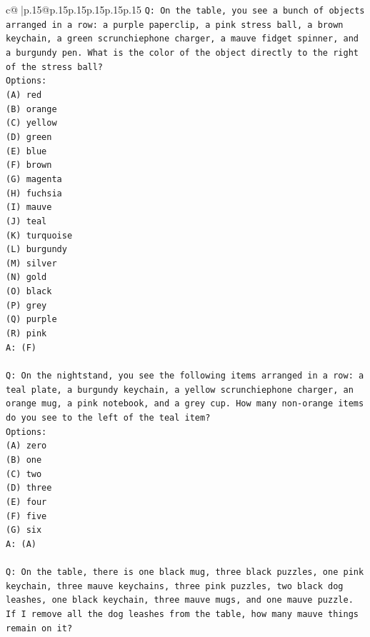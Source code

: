 \documentclass{article}
\begin{document}
{\begin{supertabular}{c@{$\;$}|p{.15\linewidth}@{}p{.15\linewidth}p{.15\linewidth}p{.15\linewidth}p{.15\linewidth}p{.15\linewidth}}
{{{\texttt{Q: On the table, you see a bunch of objects arranged in a row: a purple paperclip, a pink stress ball, a brown keychain, a green scrunchiephone charger, a mauve fidget spinner, and a burgundy pen. What is the color of the object directly to the right of the stress ball?} \\
\texttt{Options:} \\
\texttt{(A) red} \\
\texttt{(B) orange} \\
\texttt{(C) yellow} \\
\texttt{(D) green} \\
\texttt{(E) blue} \\
\texttt{(F) brown} \\
\texttt{(G) magenta} \\
\texttt{(H) fuchsia} \\
\texttt{(I) mauve} \\
\texttt{(J) teal} \\
\texttt{(K) turquoise} \\
\texttt{(L) burgundy} \\
\texttt{(M) silver} \\
\texttt{(N) gold} \\
\texttt{(O) black} \\
\texttt{(P) grey} \\
\texttt{(Q) purple} \\
\texttt{(R) pink} \\
\texttt{A: (F)} \\
\\ 
\texttt{Q: On the nightstand, you see the following items arranged in a row: a teal plate, a burgundy keychain, a yellow scrunchiephone charger, an orange mug, a pink notebook, and a grey cup. How many non{-}orange items do you see to the left of the teal item?} \\
\texttt{Options:} \\
\texttt{(A) zero} \\
\texttt{(B) one} \\
\texttt{(C) two} \\
\texttt{(D) three} \\
\texttt{(E) four} \\
\texttt{(F) five} \\
\texttt{(G) six} \\
\texttt{A: (A)} \\
\\ 
\texttt{Q: On the table, there is one black mug, three black puzzles, one pink keychain, three mauve keychains, three pink puzzles, two black dog leashes, one black keychain, three mauve mugs, and one mauve puzzle. If I remove all the dog leashes from the table, how many mauve things remain on it?} \\
}}}
\end{supertabular}}
\end{document}
